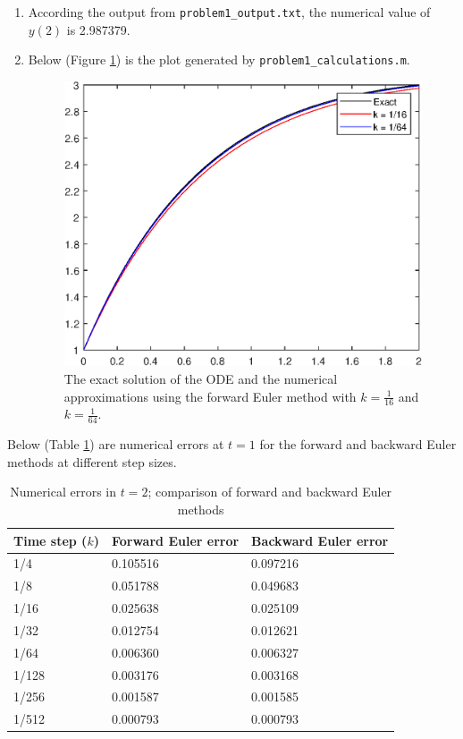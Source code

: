 \documentclass{homework}
\begin{document}
\begin{arabicparts}
\begin{enumerate}[label=({\bf\alph*})]
			\item According the output from \lstinline{problem1_output.txt}, the numerical value of $y(2)$ is 2.987379.
			\item Below (Figure \ref{fig:p13c}) is the plot generated by \lstinline{problem1_calculations.m}.
			\begin{figure}[h]
				\centering
				\includegraphics{p1.3c.eps}
				\caption{The exact solution of the ODE and the numerical approximations using the forward Euler method with $k = \frac{1}{16}$ and $k = \frac{1}{64}$.}
				\label{fig:p13c}
			\end{figure}
		\end{enumerate}
		
		\questionpart Below (Table \ref{table:p1}) are numerical errors at $t=1$ for the forward and backward Euler methods at different step sizes.
		
		\begin{table}[htb]
			\centering
			\begin{tabular}{@{}lll@{}}
				\toprule
				Time step ($k$) & Forward Euler error & Backward Euler error \\
				\midrule
				1/4 & 0.105516 & 0.097216 \\
				1/8 & 0.051788 & 0.049683 \\
				1/16 & 0.025638 & 0.025109 \\
				1/32 & 0.012754 & 0.012621 \\
				1/64 & 0.006360 & 0.006327 \\
				1/128 & 0.003176 & 0.003168 \\
				1/256 & 0.001587 & 0.001585 \\
				1/512 & 0.000793 & 0.000793 \\
				\bottomrule
			\end{tabular}
			\caption{Numerical errors in $t=2$; comparison of forward and backward Euler methods}
			\label{table:p1}
		\end{table}
	\end{arabicparts}
	
\end{document}
